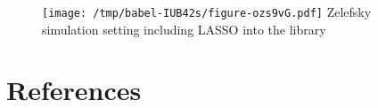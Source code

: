 \documentclass[a4paper,danish]{article}
\begin{document}
\begin{figure}[htbp]
\centering
\texttt{[image: /tmp/babel-IUB42s/figure-ozs9vG.pdf]}
Zelefsky simulation setting including LASSO into the library
\end{figure}



\section{References}
\label{sec:org53b63a4}
\renewcommand{\section}[2]{} 

\end{document}
